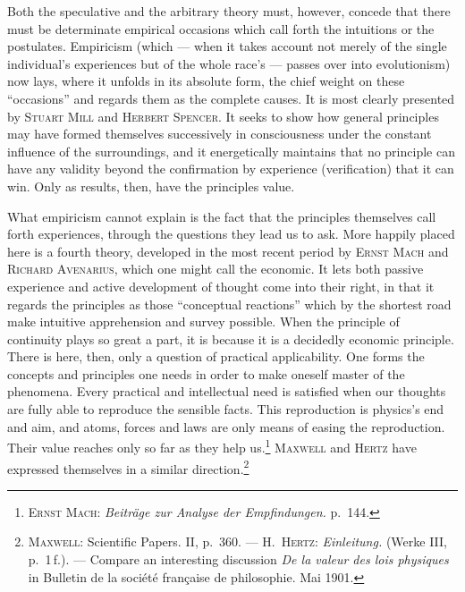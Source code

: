\documentclass[12pt,a4paper]{book}
\newcommand{\opage}[1]{\marginnote{\footnotesize\textit{[#1]}}}
\begin{document}
Both the speculative and the arbitrary theory must, however, concede that there
must be determinate empirical occasions which call forth the intuitions or the
postulates. Empiricism (which --- when it takes account not merely of the single
individual's experiences but of the whole race's --- passes over into
evolutionism) now lays, where it unfolds in its absolute form, the chief weight
on these ``occasions'' and regards them as the complete causes. It is most
clearly presented by \textsc{Stuart Mill} and \textsc{Herbert Spencer}. It seeks
to show how general principles may have formed themselves successively in
consciousness under the constant influence of the surroundings, and it
energetically maintains that no principle can have any validity beyond the
confirmation by experience (verification) that it can win. Only as results, then,
have the principles value.

What empiricism cannot explain is the fact that the principles themselves call
forth experiences, through the questions they lead us to ask. More happily
placed here is a fourth theory, developed in the most recent period by
\textsc{Ernst Mach} and \textsc{Richard Avenarius}, which one might call the
economic. It lets both passive experience and active development of thought come
into their right, in that it regards the principles as those ``conceptual
reactions'' which by the shortest road make intuitive apprehension and survey
possible. When the principle of continuity plays so great \opage{33}a part, it is because
it is a decidedly economic principle. There is here, then, only a question of
practical applicability. One forms the concepts and principles one needs in
order to make oneself master of the phenomena. Every practical and intellectual
need is satisfied when our thoughts are fully able to reproduce the sensible
facts. This reproduction is physics's end and aim, and atoms, forces and laws
are only means of easing the reproduction. Their value reaches only so far as
they help us.\footnote{\textsc{Ernst Mach}: \textit{Beiträge zur Analyse der
Empfindungen.} p.~144.} \textsc{Maxwell} and \textsc{Hertz} have expressed
themselves in a similar direction.\footnote{\textsc{Maxwell}: Scientific Papers.
II, p.~360. --- \textsc{H.~Hertz}: \textit{Einleitung.} (Werke III, p.~1\,f.).
--- Compare an interesting discussion \textit{De la valeur des lois physiques}
in Bulletin de la société française de philosophie. Mai 1901.}
\end{document}
